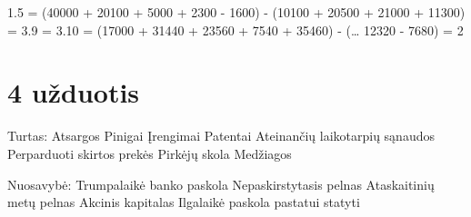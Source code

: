 1.5 = (40000 + 20100 + 5000 + 2300 - 1600) - (10100 + 20500 + 21000 + 11300) = 
3.9 = 3.10 = (17000 + 31440 + 23560 + 7540 + 35460) - (… 12320  - 7680) = 2 

\section{4 užduotis}

Turtas:
Atsargos
Pinigai
Įrengimai
Patentai
Ateinančių laikotarpių sąnaudos
Perparduoti skirtos prekės
Pirkėjų skola
Medžiagos

Nuosavybė:
Trumpalaikė banko paskola
Nepaskirstytasis pelnas
Ataskaitinių metų pelnas
Akcinis kapitalas
Ilgalaikė paskola pastatui statyti
